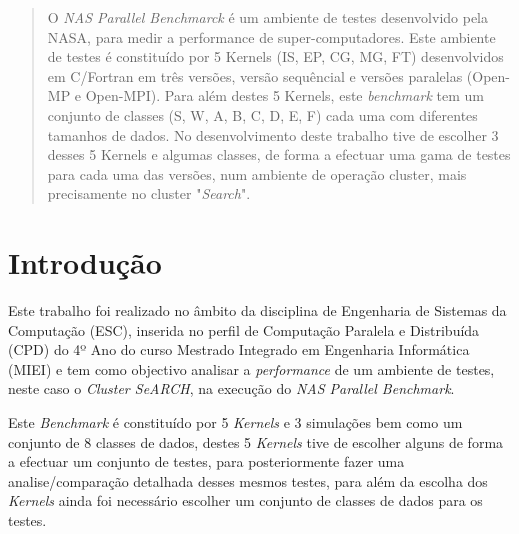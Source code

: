 \documentclass[conference,compsoc]{IEEEtran}
\begin{document}




\maketitle

\begin{abstract}
O \textit{NAS Parallel Benchmarck} é um ambiente de testes desenvolvido pela NASA, para medir a performance de super-computadores. Este ambiente de testes é constituído por 5 Kernels (IS, EP, CG, MG, FT) desenvolvidos em C/Fortran em três versões, versão sequêncial e versões paralelas (Open-MP e Open-MPI). Para além destes 5 Kernels, este \textit{benchmark} tem um conjunto de classes (S, W, A, B, C, D, E, F) cada uma com diferentes tamanhos de dados. No desenvolvimento deste trabalho tive de escolher 3 desses 5 Kernels e algumas classes, de forma a efectuar uma gama de testes para cada uma das versões, num ambiente de operação cluster, mais precisamente no cluster "\textit{Search}". 
\end{abstract}





%
\IEEEpeerreviewmaketitle



\section{Introdução}
Este trabalho foi realizado no âmbito da disciplina de Engenharia de Sistemas da Computação (ESC), inserida no perfil de Computação Paralela e Distribuída (CPD) do 4º Ano do curso Mestrado Integrado em Engenharia Informática (MIEI) e tem como objectivo analisar a \textit{performance} de um ambiente de testes, neste caso o \textit{Cluster SeARCH}, na execução do \textit{NAS Parallel Benchmark}.


Este \textit{Benchmark} é constituído por 5 \textit{Kernels} e 3 simulações bem como um conjunto de 8 classes de dados, destes 5 \textit{Kernels} tive de escolher alguns de forma a efectuar um conjunto de testes, para posteriormente fazer uma analise/comparação detalhada desses mesmos testes, para além da escolha dos \textit{Kernels} ainda foi necessário escolher um conjunto de classes de dados para os testes.
\end{document}
